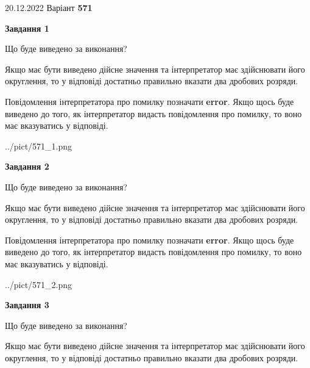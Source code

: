 \documentclass[12pt, ukrainian]{article}
\begin{document}
{20.12.2022 Варіант \No \textbf { 571 }\par}
{
\begin {Large}

{\begin {center}\textbf{Завдання 1}\end {center}}\par
Що буде виведено за виконання? \par

Якщо має бути виведено дійсне значення та інтерпретатор має здійснювати його округлення, 
то у відповіді достатньо правильно вказати два дробових розряди.

Повідомлення інтерпретатора про помилку позначати \textbf{error}.
Якщо щось буде виведено до того, як інтерпретатор видасть повідомлення про помилку, 
то воно має вказуватись у відповіді. \par

\begin{center}
	{../pict/571_1.png}
\end{center}
\newpage

{\begin {center}\textbf{Завдання 2}\end {center}}\par
Що буде виведено за виконання? \par

Якщо має бути виведено дійсне значення та інтерпретатор має здійснювати його округлення, 
то у відповіді достатньо правильно вказати два дробових розряди.

Повідомлення інтерпретатора про помилку позначати \textbf{error}.
Якщо щось буде виведено до того, як інтерпретатор видасть повідомлення про помилку, 
то воно має вказуватись у відповіді. \par

\begin{center}
	{../pict/571_2.png}
\end{center}
\newpage

{\begin {center}\textbf{Завдання 3}\end {center}}\par
Що буде виведено за виконання? \par

Якщо має бути виведено дійсне значення та інтерпретатор має здійснювати його округлення, 
то у відповіді достатньо правильно вказати два дробових розряди.


\end{Large}}
\end{document}
